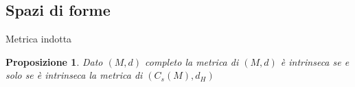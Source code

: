 \documentclass{beamer}
\newcounter{counter1}
\theoremstyle{plain}
\newtheorem{mypro}[counter1]{Proposizione}
\theoremstyle{definition}
\newtheorem{myes}[counter1]{Esempio}
\theoremstyle{remark}
\newcommand{\obar}[1]{\overline{#1}}
\newcommand{\set}[1]{\left\{#1\right\}}
\newcommand{\bra}[1]{\left[#1\right]}
\newcommand{\abs}[1]{\left|#1\right|}
\DeclareMathOperator{\len}{len}
\begin{document}

\subsection{Spazi di forme}

\begin{frame}{Metrica indotta}
  \begin{mypro}
    Dato $(M,d)$ completo la metrica di $(M,d)$ è intrinseca se e solo
    se è intrinseca la metrica di $(C_s(M),d_H)$
  \end{mypro}
\end{frame}



\end{document}
